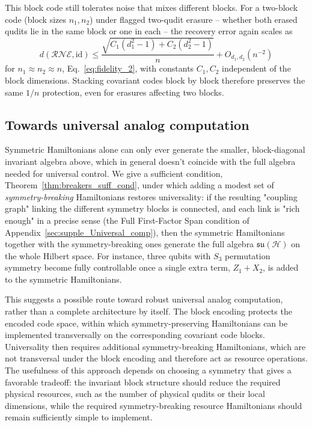 \documentclass[10pt,twocolumn,superscriptaddress,aps,amsmath,amssymb,citeautoscript,floatfix,prx]{revtex4-2}
\newcounter{alg}
\theoremstyle{plain}
\theoremstyle{plain}
\theoremstyle{plain}
\theoremstyle{plain}
\theoremstyle{plain}
\theoremstyle{plain}
\theoremstyle{plain}
\theoremstyle{definition}
\theoremstyle{plain}
\begin{document}
This block code still tolerates noise that mixes different blocks. For a two-block code (block sizes $n_1,n_2$) under flagged two-qudit erasure -- whether both erased 
qudits lie in the same block or one in each -- the recovery error again scales as
$$
d(\mathcal R\mathcal N\mathcal E,\mathrm{id})\le\frac{\sqrt{C_1(d_1^2-1)+C_2(d_2^2-1)}}{n}+O_{d_1,d_2}(n^{-2})
$$
for $n_1\approx n_2\approx n$, Eq.~\eqref{eq:fidelity_2}, with constants $C_1,C_2$ independent of the block dimensions. 
Stacking covariant codes block by block therefore preserves the same $1/n$ protection, even for erasures affecting two blocks.
 
\subsection{Towards universal analog computation}\label{subsec:summary_universal}
 
Symmetric Hamiltonians alone can only ever generate the smaller, block-diagonal invariant algebra above, which in general doesn't 
coincide with the full algebra needed for universal control. We give a sufficient condition, Theorem~\ref{thm:breakers_suff_cond}, 
under which adding a modest set of \emph{symmetry-breaking} Hamiltonians restores universality: if the resulting "coupling graph" 
linking the different symmetry blocks is connected, and each link is "rich enough" in a precise sense 
(the Full First-Factor Span condition of Appendix~\ref{sec:supple_Universal_comp}), then the symmetric Hamiltonians together with the 
symmetry-breaking ones generate the full algebra $\mathfrak{su}(\mathcal H)$ on the whole Hilbert space. 
For instance, three qubits with $S_3$ permutation symmetry become fully controllable once a single extra term, $Z_1+X_2$, is added to the symmetric Hamiltonians.
 
This suggests a possible route toward robust universal analog computation, rather than a complete architecture by itself. 
The block encoding protects the encoded code space, within which symmetry-preserving Hamiltonians can be 
implemented transversally on the corresponding covariant code blocks. Universality then requires additional symmetry-breaking Hamiltonians, 
which are not transversal under the block encoding and therefore act as resource operations. 
The usefulness of this approach depends on choosing a symmetry that gives a favorable tradeoff: 
the invariant block structure should reduce the required physical resources, such as the number of physical qudits or their local dimensions, 
while the required symmetry-breaking resource Hamiltonians should remain sufficiently simple to implement.
\end{document}
